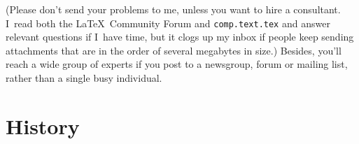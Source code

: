 (Please don't send your problems to me, unless you want to hire a
consultant. I~read both the \LaTeX\ Community Forum and
\texttt{comp.text.tex} and answer relevant questions if I~have time,
but it clogs up my inbox if people keep sending attachments that are in
the order of several megabytes in size.) Besides, you'll reach a
wide group of experts if you post to a newsgroup, forum or mailing
list, rather than a single busy individual.


\ifpdf\else\fi

\backmatter


\clearpage{}
{}




\printglossary[type=acronym,nonumberlist,style=acronyms]

\setdoublecolumnglo
\printglossary[style=summary]

\printindex





\chapter{History}



